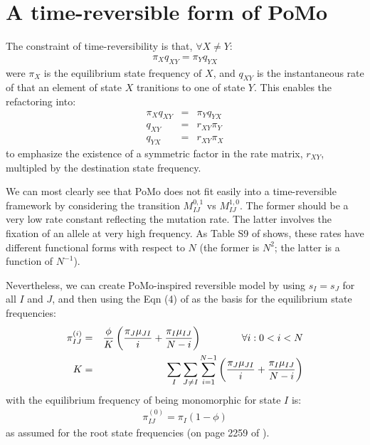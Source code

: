 \documentclass{llncs}
\newcommand{\polyProb}{\ensuremath{\phi}}}
\newcommand{\Knorm}{\ensuremath{K}}}
\newcommand{\pomo}{PoMo\xspace}
\begin{document}
\section{A time-reversible form of \pomo}
The constraint of time-reversibility is that, $\forall X \neq Y$:
\begin{eqnarray}
    \pi_X q_{XY} = \pi_Y q_{YX}
\end{eqnarray}
were $\pi_X$ is the equilibrium state frequency of $X$, and $q_{XY}$ is the instantaneous
    rate of that an element of state $X$ tranitions to one of state $Y$.
This enables the refactoring into:
\begin{eqnarray}
    \pi_X q_{XY} & = & \pi_Y q_{YX} \\
    q_{XY} & = & r_{XY}\pi_Y \\
    q_{YX} & = & r_{XY}\pi_X
\end{eqnarray}
to emphasize the existence of a symmetric factor in the rate matrix, $r_{XY}$, multipled by the destination state frequency.

We can most clearly see that \pomo does not fit easily into a time-reversible framework by considering 
    the transition $M_{IJ}^{0,1}$ vs $M_{IJ}^{1,0}$. 
The former should be a very low rate constant reflecting the mutation rate.
The latter involves the fixation of an allele at very high frequency.
As Table S9 of  \cite{DeMaioSK2013} shows, these rates have different functional forms with respect to $N$ (the former is $N^2$; the latter is a function of $N^{-1}$).

Nevertheless, we can create \pomo-inspired reversible model by using
    $s_I= s_J$ for all $I$ and $J$, and then using the Eqn (4) of \cite{DeMaioSK2013}
    as the basis for the equilibrium state frequencies:
\begin{eqnarray}
\pi_{IJ}^{(i)} & = & \frac{\polyProb}{\Knorm }\left(
    \frac{\pi_J\mu_{JI}}{i} + \frac{\pi_I\mu_{IJ}}{N-i}\right) \hskip 4em \forall i: 0<i<N \label{stateFreqPoly}\\
    \Knorm  & = & \sum_I \sum_{J\neq I}\sum_{i=1}^{N-1} \left(
    \frac{\pi_J\mu_{JI}}{i} + \frac{\pi_I\mu_{IJ}}{N-i}\right) \label{KnormDef}
\end{eqnarray}
with the equilibrium frequency of being monomorphic for state $I$ is:
\begin{eqnarray}
    \pi_{IJ}^{(0)} = \pi_I(1-\polyProb) \label{monoStateFreq}
\end{eqnarray}
as assumed for the root state frequencies (on page 2259 of \cite{DeMaioSK2013}).
\end{document}
